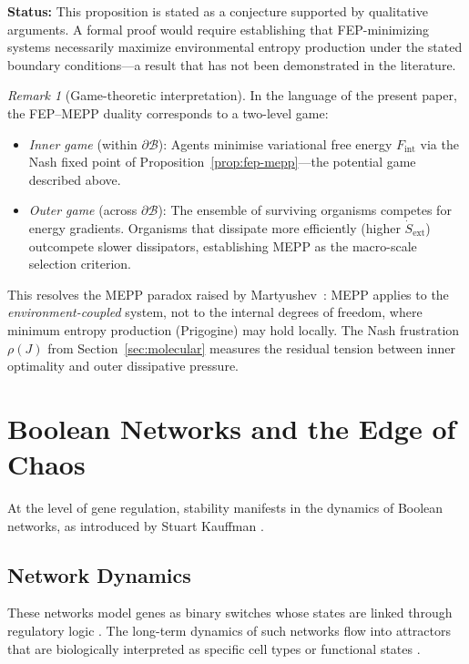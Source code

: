 \documentclass[12pt,a4paper]{article}
\theoremstyle{remark}
\newtheorem{remark}{Remark}
\begin{document}
\noindent\textbf{Status:} This proposition is stated as a conjecture supported by qualitative arguments. A formal proof would require establishing that FEP-minimizing systems necessarily maximize environmental entropy production under the stated boundary conditions---a result that has not been demonstrated in the literature.

\begin{remark}[Game-theoretic interpretation]
In the language of the present paper, the FEP--MEPP duality
corresponds to a two-level game:
\begin{itemize}
  \item \emph{Inner game} (within $\partial\mathcal{B}$): Agents
    minimise variational free energy $F_{\mathrm{int}}$ via the
    Nash fixed point of Proposition~\ref{prop:fep-mepp}---the
    potential game described above.
  \item \emph{Outer game} (across $\partial\mathcal{B}$):
    The ensemble of surviving organisms competes for energy
    gradients. Organisms that dissipate more efficiently
    (higher $\dot{S}_{\mathrm{ext}}$) outcompete slower
    dissipators, establishing MEPP as the macro-scale selection
    criterion.
\end{itemize}
This resolves the MEPP paradox raised by
Martyushev~\cite{Martyushev2010}: MEPP applies to the
\emph{environment-coupled} system, not to the internal degrees
of freedom, where minimum entropy production (Prigogine) may
hold locally. The Nash frustration $\rho(J)$ from
Section~\ref{sec:molecular} measures the residual tension
between inner optimality and outer dissipative pressure.
\end{remark}

\section{Boolean Networks and the Edge of Chaos}
\label{sec:boolean}

At the level of gene regulation, stability manifests in the dynamics of Boolean networks, as introduced by Stuart Kauffman \citep{BooleanPost,KauffmanOrigins}.

\subsection{Network Dynamics}

These networks model genes as binary switches whose states are linked through regulatory logic \citep{BooleanPost}. The long-term dynamics of such networks flow into attractors that are biologically interpreted as specific cell types or functional states \citep{BooleanEvolution}.
\end{document}
